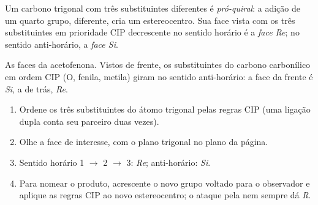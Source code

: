 \begin{definition}\label{def:b3:asymmetric-synthesis:faces}
Um carbono trigonal com três substituintes diferentes é \emph{pró-quiral}:
a adição de um quarto grupo, diferente, cria um estereocentro. Sua face vista com
os três substituintes em prioridade CIP decrescente no sentido horário é a
\emph{face Re}; no sentido anti-horário, a \emph{face Si}.
\end{definition}

\begin{omfigure}

{\small As faces da acetofenona. Vistos de frente, os substituintes do
carbono carbonílico em ordem CIP (O, fenila, metila) giram no sentido anti-horário: a face
da frente é \textit{Si}, a de trás, \textit{Re}.}
\end{omfigure}

\begin{method}\label{met:b3:asymmetric-synthesis:re-si}
\begin{enumerate}
  \item Ordene os três substituintes do átomo trigonal pelas regras CIP (uma
        ligação dupla conta seu parceiro duas vezes).
  \item Olhe a face de interesse, com o plano trigonal no plano da página.
  \item Sentido horário 1 $\to$ 2 $\to$ 3: \textit{Re}; anti-horário: \textit{Si}.
  \item Para nomear o produto, acrescente o novo grupo voltado para o observador e aplique as
        regras CIP ao novo estereocentro; o ataque pela  nem sempre dá \textit{R}.
\end{enumerate}
\end{method}

